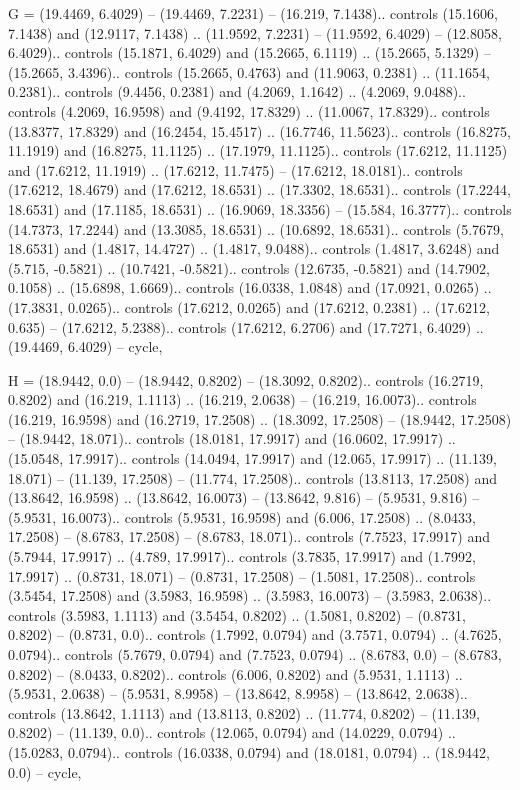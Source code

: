 G = {(19.4469, 6.4029) -- (19.4469, 7.2231) -- (16.219, 7.1438).. controls (15.1606, 7.1438) and (12.9117, 7.1438) .. (11.9592, 7.2231) -- (11.9592, 6.4029) -- (12.8058, 6.4029).. controls (15.1871, 6.4029) and (15.2665, 6.1119) .. (15.2665, 5.1329) -- (15.2665, 3.4396).. controls (15.2665, 0.4763) and (11.9063, 0.2381) .. (11.1654, 0.2381).. controls (9.4456, 0.2381) and (4.2069, 1.1642) .. (4.2069, 9.0488).. controls (4.2069, 16.9598) and (9.4192, 17.8329) .. (11.0067, 17.8329).. controls (13.8377, 17.8329) and (16.2454, 15.4517) .. (16.7746, 11.5623).. controls (16.8275, 11.1919) and (16.8275, 11.1125) .. (17.1979, 11.1125).. controls (17.6212, 11.1125) and (17.6212, 11.1919) .. (17.6212, 11.7475) -- (17.6212, 18.0181).. controls (17.6212, 18.4679) and (17.6212, 18.6531) .. (17.3302, 18.6531).. controls (17.2244, 18.6531) and (17.1185, 18.6531) .. (16.9069, 18.3356) -- (15.584, 16.3777).. controls (14.7373, 17.2244) and (13.3085, 18.6531) .. (10.6892, 18.6531).. controls (5.7679, 18.6531) and (1.4817, 14.4727) .. (1.4817, 9.0488).. controls (1.4817, 3.6248) and (5.715, -0.5821) .. (10.7421, -0.5821).. controls (12.6735, -0.5821) and (14.7902, 0.1058) .. (15.6898, 1.6669).. controls (16.0338, 1.0848) and (17.0921, 0.0265) .. (17.3831, 0.0265).. controls (17.6212, 0.0265) and (17.6212, 0.2381) .. (17.6212, 0.635) -- (17.6212, 5.2388).. controls (17.6212, 6.2706) and (17.7271, 6.4029) .. (19.4469, 6.4029) -- cycle},

H = {(18.9442, 0.0) -- (18.9442, 0.8202) -- (18.3092, 0.8202).. controls (16.2719, 0.8202) and (16.219, 1.1113) .. (16.219, 2.0638) -- (16.219, 16.0073).. controls (16.219, 16.9598) and (16.2719, 17.2508) .. (18.3092, 17.2508) -- (18.9442, 17.2508) -- (18.9442, 18.071).. controls (18.0181, 17.9917) and (16.0602, 17.9917) .. (15.0548, 17.9917).. controls (14.0494, 17.9917) and (12.065, 17.9917) .. (11.139, 18.071) -- (11.139, 17.2508) -- (11.774, 17.2508).. controls (13.8113, 17.2508) and (13.8642, 16.9598) .. (13.8642, 16.0073) -- (13.8642, 9.816) -- (5.9531, 9.816) -- (5.9531, 16.0073).. controls (5.9531, 16.9598) and (6.006, 17.2508) .. (8.0433, 17.2508) -- (8.6783, 17.2508) -- (8.6783, 18.071).. controls (7.7523, 17.9917) and (5.7944, 17.9917) .. (4.789, 17.9917).. controls (3.7835, 17.9917) and (1.7992, 17.9917) .. (0.8731, 18.071) -- (0.8731, 17.2508) -- (1.5081, 17.2508).. controls (3.5454, 17.2508) and (3.5983, 16.9598) .. (3.5983, 16.0073) -- (3.5983, 2.0638).. controls (3.5983, 1.1113) and (3.5454, 0.8202) .. (1.5081, 0.8202) -- (0.8731, 0.8202) -- (0.8731, 0.0).. controls (1.7992, 0.0794) and (3.7571, 0.0794) .. (4.7625, 0.0794).. controls (5.7679, 0.0794) and (7.7523, 0.0794) .. (8.6783, 0.0) -- (8.6783, 0.8202) -- (8.0433, 0.8202).. controls (6.006, 0.8202) and (5.9531, 1.1113) .. (5.9531, 2.0638) -- (5.9531, 8.9958) -- (13.8642, 8.9958) -- (13.8642, 2.0638).. controls (13.8642, 1.1113) and (13.8113, 0.8202) .. (11.774, 0.8202) -- (11.139, 0.8202) -- (11.139, 0.0).. controls (12.065, 0.0794) and (14.0229, 0.0794) .. (15.0283, 0.0794).. controls (16.0338, 0.0794) and (18.0181, 0.0794) .. (18.9442, 0.0) -- cycle},


